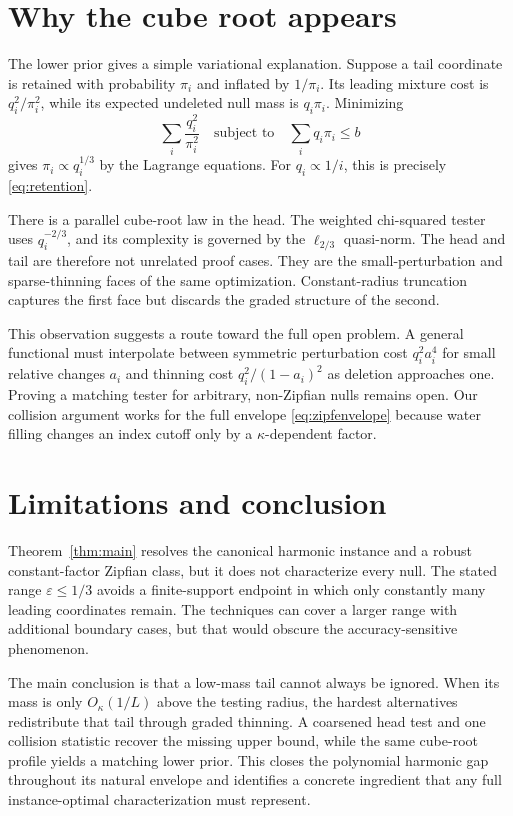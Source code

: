 \documentclass{article}
\newcommand{\1}{\mathbf 1}
\begin{document}
\section{Why the cube root appears}
\label{sec:interpretation}

The lower prior gives a simple variational explanation. Suppose a tail coordinate is retained with probability $\pi_i$ and inflated by $1/\pi_i$. Its leading mixture cost is $q_i^2/\pi_i^2$, while its expected undeleted null mass is $q_i\pi_i$. Minimizing \[ \sum_i\frac{q_i^2}{\pi_i^2} \quad\text{subject to}\quad \sum_iq_i\pi_i\leq b \tag{23}\label{eq:variational} \] gives $\pi_i\propto q_i^{1/3}$ by the Lagrange equations. For $q_i\propto1/i$, this is precisely \eqref{eq:retention}.

There is a parallel cube-root law in the head. The weighted chi-squared tester uses $q_i^{-2/3}$, and its complexity is governed by the $\ell_{2/3}$ quasi-norm. The head and tail are therefore not unrelated proof cases. They are the small-perturbation and sparse-thinning faces of the same optimization. Constant-radius truncation captures the first face but discards the graded structure of the second.

This observation suggests a route toward the full open problem. A general functional must interpolate between symmetric perturbation cost $q_i^2a_i^4$ for small relative changes $a_i$ and thinning cost $q_i^2/(1-a_i)^2$ as deletion approaches one. Proving a matching tester for arbitrary, non-Zipfian nulls remains open. Our collision argument works for the full envelope \eqref{eq:zipfenvelope} because water filling changes an index cutoff only by a $\kappa$-dependent factor.

\section{Limitations and conclusion}

Theorem~\ref{thm:main} resolves the canonical harmonic instance and a robust constant-factor Zipfian class, but it does not characterize every null. The stated range $\varepsilon\leq1/3$ avoids a finite-support endpoint in which only constantly many leading coordinates remain. The techniques can cover a larger range with additional boundary cases, but that would obscure the accuracy-sensitive phenomenon.

The main conclusion is that a low-mass tail cannot always be ignored. When its mass is only $O_\kappa(1/L)$ above the testing radius, the hardest alternatives redistribute that tail through graded thinning. A coarsened head test and one collision statistic recover the missing upper bound, while the same cube-root profile yields a matching lower prior. This closes the polynomial harmonic gap throughout its natural envelope and identifies a concrete ingredient that any full instance-optimal characterization must represent.




\appendix

\end{document}
